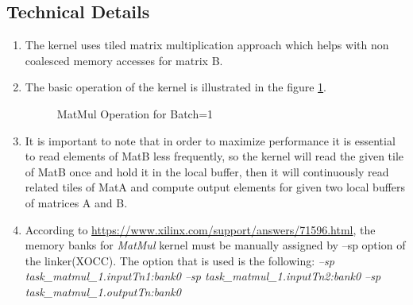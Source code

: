 \documentclass[•]{article}
\begin{document}
\subsection{Technical Details}
\begin{enumerate}
\item The kernel uses tiled matrix multiplication approach which helps with non coalesced memory accesses for matrix B.
\item The basic operation of the kernel is illustrated in the figure \ref{fig:matmul01}.

\begin{figure}[h] 
\caption{MatMul Operation for Batch=1}
\label{fig:matmul01}
\centering
{}
\end{figure}


\item It is important to note that in order to maximize performance it is essential to read elements of MatB less frequently, so the kernel will read the given tile of MatB once and hold it in the local buffer, then it will continuously read related tiles of MatA and compute output elements for given two local buffers of matrices A and B. 

\item According to \url{https://www.xilinx.com/support/answers/71596.html}, the memory banks for \emph{MatMul} kernel must be manually assigned by --sp option of the linker(XOCC). The option that is used is the following: \emph{--sp task\_matmul\_1.inputTn1:bank0 --sp task\_matmul\_1.inputTn2:bank0 --sp task\_matmul\_1.outputTn:bank0}
\end{enumerate}









\clearpage
\end{document}
